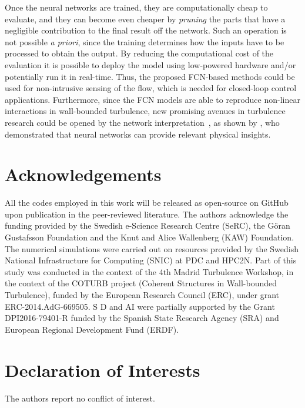 Once the neural networks are trained, they are computationally cheap to evaluate, and they can become even cheaper by \textit{pruning} the parts that have a negligible contribution to the final result off the network.
Such an operation is not possible \textit{a priori}, since the training determines how the inputs have to be processed to obtain the output.
By reducing the computational cost of the evaluation it is possible to deploy the model using low-powered hardware and/or potentially run it in real-time.
Thus, the proposed FCN-based methods could be used for non-intrusive sensing of the flow, which is needed for closed-loop control applications.
Furthermore, since the FCN models are able to reproduce non-linear interactions in wall-bounded turbulence, new promising avenues in turbulence research could be opened by the network interpretation~\citep{fan2020interpretability}, as shown by \citet{iten2020discovering}, who demonstrated that neural networks can provide relevant physical insights.

\section*{Acknowledgements}
All the codes employed in this work will be released as open-source on GitHub upon publication in the peer-reviewed literature.
The authors acknowledge the funding provided by the Swedish e-Science Research Centre (SeRC), the G\"oran Gustafsson Foundation and the Knut and Alice Wallenberg (KAW) Foundation.
The numerical simulations were carried out on resources provided by the Swedish National Infrastructure for Computing (SNIC) at PDC and HPC2N.
Part of this study was conducted in the context of the 4th Madrid Turbulence Workshop, in the context of the COTURB project (Coherent Structures in Wall-bounded Turbulence), funded by the European Research Council (ERC), under grant ERC-2014.AdG-669505. S
D and AI were partially supported by the Grant DPI2016-79401-R funded by the Spanish State Research Agency (SRA) and European Regional Development Fund (ERDF).

\section*{Declaration of Interests}
The authors report no conflict of interest.

\appendix
